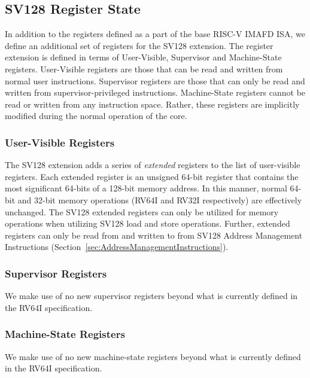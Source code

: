 \documentclass{article}
\begin{document}
\subsection{SV128 Register State}
In addition to the registers defined as a part of the base RISC-V IMAFD ISA, we define an additional set of registers for the SV128 extension.  The register extension is defined in terms of User-Visible, Supervisor and Machine-State registers.  User-Visible registers are those that can be read and written from normal user instructions.  Supervisor registers are those that can only be read and written from supervisor-privileged instructions.  Machine-State registers cannot be read or written from any instruction space.  Rather, these registers are implicitly modified during the normal operation of the core.     

\subsubsection{User-Visible Registers} 
The SV128 extension adds a series of \emph{extended} registers to the list of user-visible registers.  Each extended register is an unsigned 64-bit register that contains the most significant 64-bits of a 128-bit memory address.  In this manner, normal 64-bit and 32-bit memory operations (RV64I and RV32I respectively) are effectively unchanged.  The SV128 extended registers can only be utilized for memory operations when utilizing SV128 load and store operations.  Further, extended registers can only be read from and written to from SV128 Address Management Instructions (Section~\ref{sec:AddressManagementInstructions}).   

\begin{center}
\end{center}

\subsubsection{Supervisor Registers}

We make use of no new supervisor registers beyond what is 
currently defined in the RV64I specification.  

\subsubsection{Machine-State Registers}

We make use of no new machine-state registers beyond what is 
currently defined in the RV64I specification.  
\end{document}
